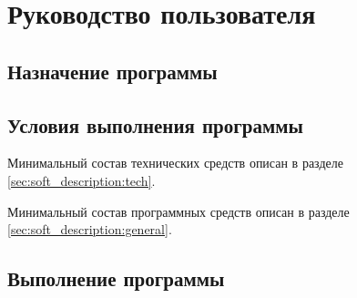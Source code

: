 \section{Руководство пользователя}
\label{sec:man}

\subsection{Назначение программы}


\subsection{Условия выполнения программы}

Минимальный состав технических средств описан в разделе \ref{sec:soft_description:tech}.

Минимальный состав программных средств описан в разделе \ref{sec:soft_description:general}.

\subsection{Выполнение программы}




